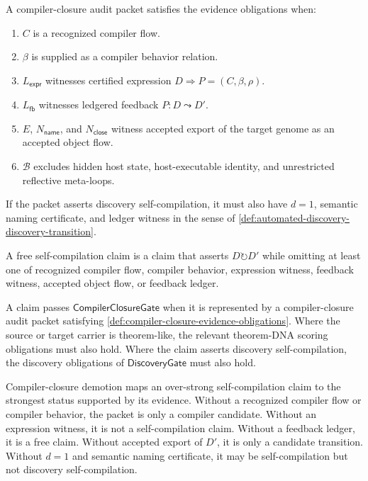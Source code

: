 \begin{definition}
\label{def:compiler-closure-evidence-obligations}
A compiler-closure audit packet satisfies the evidence obligations when:
\begin{enumerate}
\item $C$ is a recognized compiler flow.
\item $\beta$ is supplied as a compiler behavior relation.
\item $L_{\mathsf{expr}}$ witnesses certified expression $D\Rightarrow
P=(C,\beta,\rho)$.
\item $L_{\mathsf{fb}}$ witnesses ledgered feedback $P:D\leadsto D'$.
\item $E$, $N_{\mathsf{name}}$, and $N_{\mathsf{close}}$ witness accepted
export of the target genome as an accepted object flow.
\item $\mathcal B$ excludes hidden host state, host-executable identity, and
unrestricted reflective meta-loops.
\end{enumerate}
If the packet asserts discovery self-compilation, it must also have $d=1$,
semantic naming certificate, and ledger witness in the sense of
\autoref{def:automated-discovery-discovery-transition}.
\end{definition}

\begin{definition}
\label{def:compiler-closure-free-claim}
A free self-compilation claim is a claim that asserts
$D\circlearrowright D'$ while omitting at least one of recognized compiler
flow, compiler behavior, expression witness, feedback witness, accepted object
flow, or feedback ledger.
\end{definition}

\begin{definition}[CompilerClosureGate]
\label{def:compiler-closure-gate}
A claim passes $\mathsf{CompilerClosureGate}$ when it is represented by a
compiler-closure audit packet satisfying
\autoref{def:compiler-closure-evidence-obligations}. Where the source or
target carrier is theorem-like, the relevant theorem-DNA scoring obligations
must also hold. Where the claim asserts discovery self-compilation, the
discovery obligations of $\mathsf{DiscoveryGate}$ must also hold.
\end{definition}

\begin{definition}
\label{def:compiler-closure-demotion}
Compiler-closure demotion maps an over-strong self-compilation claim to the
strongest status supported by its evidence. Without a recognized compiler flow
or compiler behavior, the packet is only a compiler candidate. Without an
expression witness, it is not a self-compilation claim. Without a feedback
ledger, it is a free claim. Without accepted export of $D'$, it is only a
candidate transition. Without $d=1$ and semantic naming certificate, it may be
self-compilation but not discovery self-compilation.
\end{definition}

